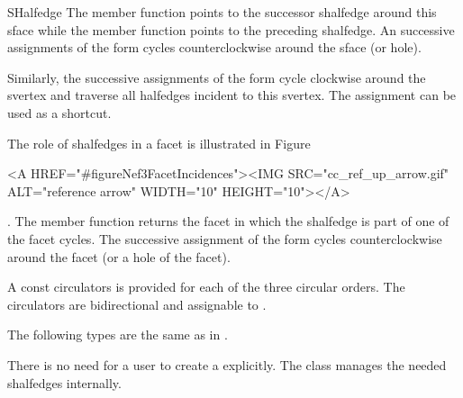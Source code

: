 \begin{ccRefClass}{SHalfedge}
The  member function points 
to the successor shalfedge around this sface while the  member 
function points to the preceding shalfedge.  An
successive assignments of the form  cycles
counterclockwise around the sface (or hole).

Similarly, the successive
assignments of the form  cycle
clockwise around the svertex and traverse all halfedges incident to
this svertex. The assignment  can be 
used as a shortcut.

The role of shalfedges in a facet is illustrated in 
Figure~\begin{ccHtmlOnly}
  <A HREF="#figureNef3FacetIncidences"><IMG 
  SRC="cc_ref_up_arrow.gif" ALT="reference arrow" WIDTH="10" HEIGHT="10"></A>
\end{ccHtmlOnly}. The  member function returns the facet 
in which
the shalfedge is part of one of the facet cycles. The successive assignment of 
the form  cycles counterclockwise around the facet (or a
hole of the facet).

A const circulators is provided for each of the three circular orders.
The circulators are bidirectional and assignable to .


\ccTypes
{}
\ccThreeToTwo

The following types are the same as in .



\ccGlue
{}
\ccGlue
{}
\ccGlue
{}

\ccCreation
{}

There is no need for a user to create a  explicitly. The
class  manages the needed shalfedges internally.



\end{ccRefClass}
